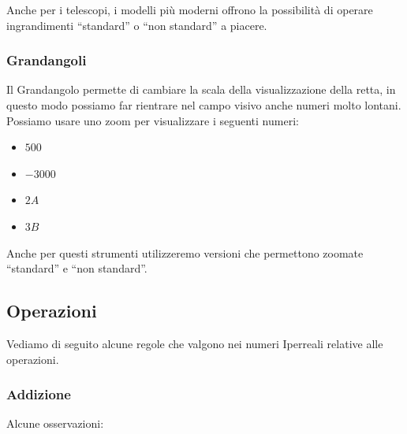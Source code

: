 Anche per i telescopi, i modelli più moderni offrono la possibilità di operare 
ingrandimenti ``standard'' o ``non standard'' a piacere.

\subsubsection{Grandangoli}
\label{subsec:insnum_microscopio}

Il Grandangolo permette di cambiare la scala della visualizzazione della retta, 
in questo modo possiamo far rientrare nel campo visivo anche numeri molto 
lontani.
Possiamo usare uno zoom per visualizzare i seguenti numeri:

\begin{multicols}{4}
\begin{itemize}
 \item $500$
 \item $-3000$
 \item $2A$
 \item $3B$
\end{itemize}
\end{multicols}

Anche per questi strumenti utilizzeremo versioni che permettono zoomate 
``standard'' e ``non standard''.

\subsection{Operazioni}
\label{subsec:insnum_operazioni}

Vediamo di seguito alcune regole che valgono nei numeri Iperreali relative alle 
operazioni.

\subsubsection{Addizione}
\label{subsec:insnum_addizione}

Alcune osservazioni:


